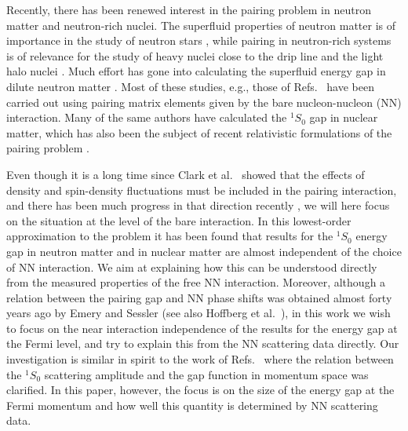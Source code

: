 \begin{multicols}{2}

Recently, there has been renewed interest in the pairing problem in 
neutron matter and neutron-rich nuclei.  The superfluid properties 
of neutron matter is of importance in the study of neutron stars 
\cite{petra95}, while pairing in neutron-rich systems is of relevance 
for the study of heavy nuclei close to the drip line \cite{mulshe93} 
and the light halo nuclei \cite{riis94}.  Much effort has gone into 
calculating the superfluid energy gap in dilute neutron matter 
\cite{baldo90,chen93,tak93,elg96,khodel96}.  
Most of these studies,  
e.g., those of Refs.\ \cite{baldo90,tak93,elg96,khodel96} have been carried 
out using pairing matrix elements given by the bare nucleon-nucleon 
(NN) interaction.  Many of the same authors have calculated the 
$^1S_0$ gap in nuclear matter, which has also been the subject of  
recent relativistic formulations of the pairing problem 
\cite{ring90,guim96,matera97}.  

Even though it is a long time since  
Clark et al.\ \cite{clark76} showed that the effects of density and 
spin-density fluctuations must be included in the pairing interaction, 
and there 
has been much progress in that direction recently \cite{wam93,schulze96}, 
we will here focus on the situation at the level of the 
bare interaction.  In this lowest-order approximation to the 
problem it has been found that results for the $^1S_0$ energy 
gap in neutron matter and in nuclear matter are almost independent 
of the choice of NN interaction.  
We aim at explaining how this can 
be understood directly from the measured properties of the free NN 
interaction.  
Moreover, although a relation between the pairing gap and
NN phase shifts was obtained almost forty years ago by Emery and
Sessler \cite{es60} (see also Hoffberg et al.\ \cite{hoffberg70}),  
in this work we wish to focus on the near 
interaction independence of the results for the energy gap at the 
Fermi level, and try to explain this from the NN scattering data directly.  
Our investigation is similar in spirit to the work of Refs.\ 
\cite{khodel96,carlson97} where the relation between the $^1S_0$ 
scattering amplitude and the gap function in momentum space was 
clarified.  In this paper, however, the focus is on the size 
of the energy gap at the Fermi momentum and how well this quantity is 
determined by NN scattering data.  


\end{multicols}
